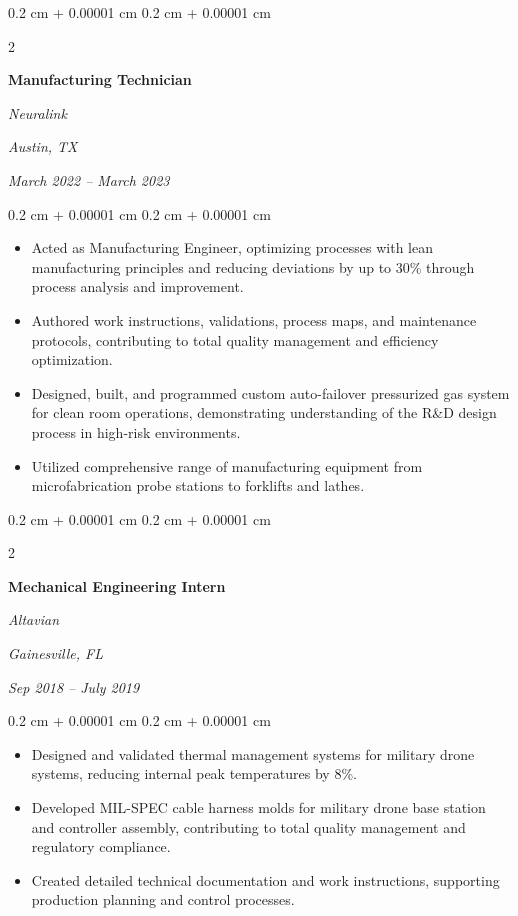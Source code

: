 \documentclass[10pt, letterpaper]{article}
\newenvironment{highlights}{
    \begin{itemize}[
        topsep=0.10 cm,
        parsep=0.10 cm,
        partopsep=0pt,
        itemsep=0pt,
        leftmargin=0.4 cm + 10pt
    ]
}{
    \end{itemize}
} %
\newenvironment{onecolentry}{
    \begin{adjustwidth}{
        0.2 cm + 0.00001 cm
    }{
        0.2 cm + 0.00001 cm
    }
}{
    \end{adjustwidth}
} %
\newenvironment{twocolentry}[2][]{
    \onecolentry
    \def\secondColumn{#2}
    \setcolumnwidth{\fill, 4.5 cm}
    \begin{paracol}{2}
}{
    \switchcolumn \raggedleft \secondColumn
    \end{paracol}
    \endonecolentry
} %
\begin{document}
        \vspace{0.35 cm}

        \begin{twocolentry}{
        \textit{Austin, TX}    
            
        \textit{March 2022 – March 2023}}
            \textbf{Manufacturing Technician}
            
            \textit{Neuralink}
        \end{twocolentry}

        \vspace{0.10 cm}
        \begin{onecolentry}
            \begin{highlights}
                \item Acted as Manufacturing Engineer, optimizing processes with lean manufacturing principles and reducing deviations by up to 30\% through process analysis and improvement.
                \item Authored work instructions, validations, process maps, and maintenance protocols, contributing to total quality management and efficiency optimization.
                \item Designed, built, and programmed custom auto-failover pressurized gas system for clean room operations, demonstrating understanding of the R\&D design process in high-risk environments.
                \item Utilized comprehensive range of manufacturing equipment from microfabrication probe stations to forklifts and lathes.
            \end{highlights}
        \end{onecolentry}


        \vspace{0.35 cm}

        \begin{twocolentry}{
        \textit{Gainesville, FL}    
            
        \textit{Sep 2018 – July 2019}}
            \textbf{Mechanical Engineering Intern}
            
            \textit{Altavian}
        \end{twocolentry}

        \vspace{0.10 cm}
        \begin{onecolentry}
            \begin{highlights}
                \item Designed and validated thermal management systems for military drone systems, reducing internal peak temperatures by 8\%.
                \item Developed MIL-SPEC cable harness molds for military drone base station and controller assembly, contributing to total quality management and regulatory compliance.
                \item Created detailed technical documentation and work instructions, supporting production planning and control processes.
            \end{highlights}
        \end{onecolentry}
\end{document}
